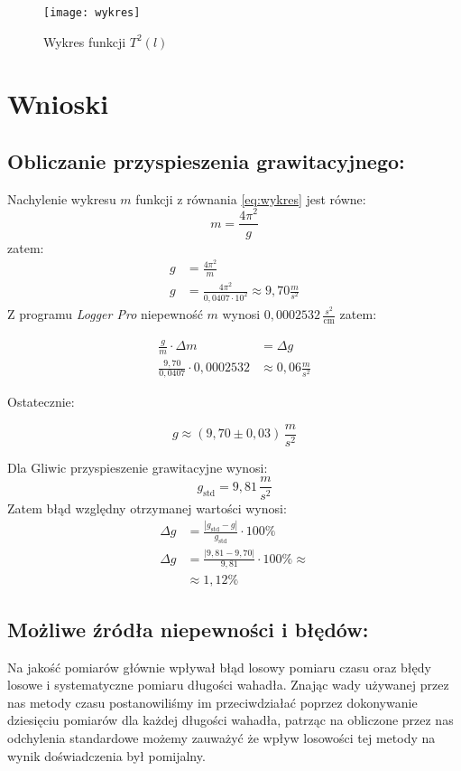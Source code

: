\documentclass[a4paper,12pt]{article}
\begin{document}
\begin{sidewaysfigure}[p]
		\centering
		\texttt{[image: wykres]}
		\caption{Wykres funkcji $T^2 \left( l \right)$}
		\label{fig:wykres}
\end{sidewaysfigure}
\section{Wnioski}
\subsection*{Obliczanie przyspieszenia grawitacyjnego:}

Nachylenie wykresu $m$ funkcji z równania \ref{eq:wykres} jest równe:
\[m = \frac{4\pi^2}{g} \]
zatem:
\begin{align*}
		g &= \frac{4\pi^2}{m}\\
		g &= \frac{4\pi^2}{0,0407 \cdot 10^2} \approx 9,70 \frac{m}{s^2}
\end{align*}
Z programu \emph{Logger Pro} niepewność $m$ wynosi $0,0002532 \, \frac{s^2}{\text{cm}}$ zatem:

\begin{align*}
		\frac{g}{m} \cdot \Delta m &= \Delta g \\
		\frac{9,70}{0,0407} \cdot 0,0002532 &\approx 0,06 \frac{m}{s^2}
\end{align*}

Ostatecznie:

\[ g \approx \left( 9,70 \pm 0,03 \right) \, \frac{m}{s^2} \]

Dla Gliwic przyspieszenie grawitacyjne wynosi:
\[ g_{\text{std}} = 9,81 \, \frac{m}{s^2}\]
Zatem błąd względny otrzymanej wartości wynosi:
\begin{align*}
		\Delta g &= \frac{\left|g_{\text{std}} - g\right|}{g_{\text{std}}} \cdot 100 \text{\%} \\
		\Delta g &= \frac{| 9,81 - 9,70|}{9,81} \cdot 100 \text{\%} \approx\\
		&\approx 1,12 \text{\%}
\end{align*}

\subsection*{Możliwe źródła niepewności i błędów:}

Na jakość pomiarów głównie wpływał błąd losowy pomiaru czasu oraz błędy losowe i systematyczne pomiaru długości wahadła. Znając
wady używanej przez nas metody czasu postanowiliśmy im przeciwdziałać poprzez dokonywanie dziesięciu pomiarów dla każdej
długości wahadła, patrząc na obliczone przez nas odchylenia standardowe możemy zauważyć że wpływ losowości tej metody na wynik
doświadczenia był pomijalny.
\end{document}
